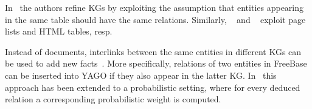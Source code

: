 In~\cite{ref20} the authors refine KGs by exploiting the assumption that entities appearing in the same table should have the same relations. Similarly, ~\cite{ref21} and ~\cite{ref22} exploit page lists and HTML tables, resp.

Instead of documents, interlinks between the same entities in different KGs can be used to add new facts~\cite{ref23, ref24}. More specifically, relations of two entities in FreeBase can be inserted into YAGO if they also appear in the latter KG. In~\cite{ref25} this approach has been extended to a probabilistic setting, where for every deduced relation a corresponding probabilistic weight is computed.